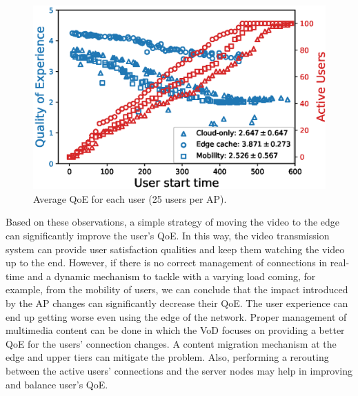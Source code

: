 \begin{figure}[!htb]
    \centering
    \includegraphics[width=\linewidth]{images/UserQoExUserStartTime25users-2.eps}
    \vspace{-0.4	cm}
    \caption{Average QoE for each user (25 users per AP).}
    \label{fig:exp-setup-25}
\end{figure}

Based on these observations,
a simple strategy of moving the video to the edge can significantly improve the user's QoE. In this way, the video transmission system can provide user satisfaction qualities and keep them watching the video up to the end. However, if there is no correct management of connections in real-time and a dynamic mechanism to tackle with a varying load coming, for example, from the mobility of users, we can conclude that the impact introduced by the AP changes can significantly decrease their QoE. The user experience can end up getting worse even using the edge of the network. Proper management of multimedia content can be done in which the VoD focuses on providing a better QoE for the users' connection changes. A content migration mechanism at the edge and upper tiers can mitigate the problem. Also, performing a rerouting between the active users' connections and the server nodes may help in improving and balance user's QoE.

